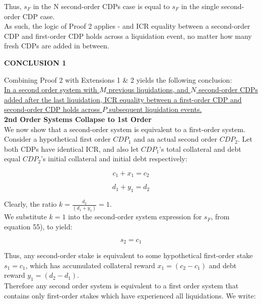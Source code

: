 \documentclass[reqno]{article}
\begin{document}
Thus, $s_F$ in the N second-order CDPs case is equal to $s_F$ in the single second-order CDP case.\\

As such, the logic of Proof 2 applies - and ICR equality between a second-order CDP and first-order CDP holds across a liquidation event, no matter how many fresh CDPs are added in between.

\bigskip
\textbf{CONCLUSION 1}

\bigskip
Combining Proof 2 with Extensions 1 \& 2 yields the following conclusion:\\

\uline{In a second order system with $M$ previous liquidations, and $N$ second-order CDPs added after the last liquidation, ICR equality between a first-order CDP and second-order CDP holds across $P$ subsequent liquidation events.}\\

\textbf{2nd Order Systems Collapse to 1st Order}\\
We now show that a second-order system is equivalent to a first-order system.\\

Consider a hypothetical first order $CDP_1$ and an actual second order $CDP_2$. Let both CDPs have identical ICR, and also let $CDP_1$’s total collateral and debt equal $CDP_2$’s initial collateral and initial debt respectively:

\begin{equation} 
    c_1+x_1=c_2
\end{equation}

\begin{equation} 
    d_1+y_1=d_2
\end{equation}

\bigskip
Clearly, the ratio  $k = \frac{d_2}{(d_1+y_1)} = 1$.\\

We substitute $k=1$ into the second-order system expression for $s_F$, from equation 55), to yield:

\begin{equation} 
    s_2=c_1
\end{equation}

\bigskip
Thus, any second-order stake is equivalent to some hypothetical first-order stake $s_1=c_1$, which has accumulated collateral reward $x_1=(c_2-c_1)$ and debt reward $y_1=(d_2-d_1)$.\\

Therefore any second order system is equivalent to a first order system that contains only first-order stakes which have experienced all liquidations. We write:
\end{document}
